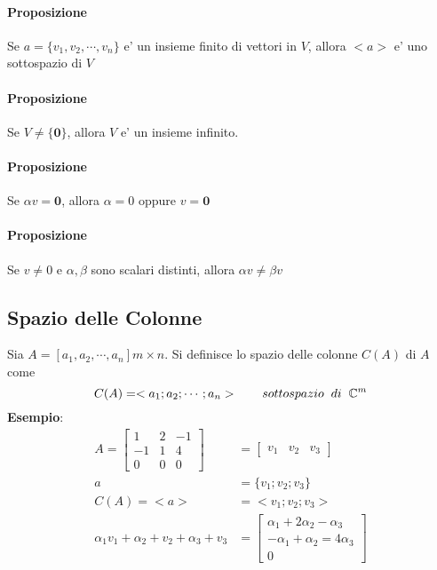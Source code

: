 \documentclass[a4paper, 10pt]{article}
\begin{document}
	\paragraph*{Proposizione} Se $a =  \lbrace v_1, v_2, \cdots, v_n \rbrace$ e' un insieme finito di vettori in $V$, 
			  allora $<a>$ e' uno sottospazio di $V$
	\paragraph*{Proposizione} Se $V \neq \lbrace \textbf{0} \rbrace $, allora $V$ e' un insieme infinito.
	
	\paragraph*{Proposizione} Se $\alpha v = \textbf{0}$, allora $\alpha = 0$ oppure $v = \textbf{0}$
	
	\paragraph*{Proposizione} Se $v \neq 0$ e $\alpha , \beta$ sono scalari distinti, allora $\alpha v \neq \beta v$
	
	\subsection{Spazio delle Colonne}
	Sia $A = [ a_1, a_2, \cdots, a_n] m \times n$. Si definisce lo spazio delle colonne $C(A)$ di $A$ come 
	\[	C(A) = <a_1; a_2; \cdots ; a_n> \hspace{0.7cm} sottospazio \hspace{0.2cm} di \hspace{0.2cm} \mathbb{C}^{m} \] 
	\textbf{Esempio}: 
	\begin{equation*}
		\begin{split}
			A = \begin{bmatrix} 1 & 2 & -1 \\ -1 & 1 & 4 \\ 0 & 0 & 0 \end{bmatrix}
			&= \begin{bmatrix} v_1 & v_2 & v_3 \end{bmatrix} \\
			a &= \lbrace v_1 ; v_2 ; v_3 \rbrace \\
			C(A) = <a> &= <v_1; v_2 ; v_3> \\
			\alpha _1 v_1 + \alpha _2 + v_2 + \alpha _3 + v_3 &= 
			\begin{bmatrix}
				\alpha _1 + 2\alpha _2 - \alpha _3 \\
				-\alpha _1 + \alpha _2 = 4 \alpha _3 \\
				0
			\end{bmatrix}
		\end{split}
	\end{equation*}
	
\end{document}
